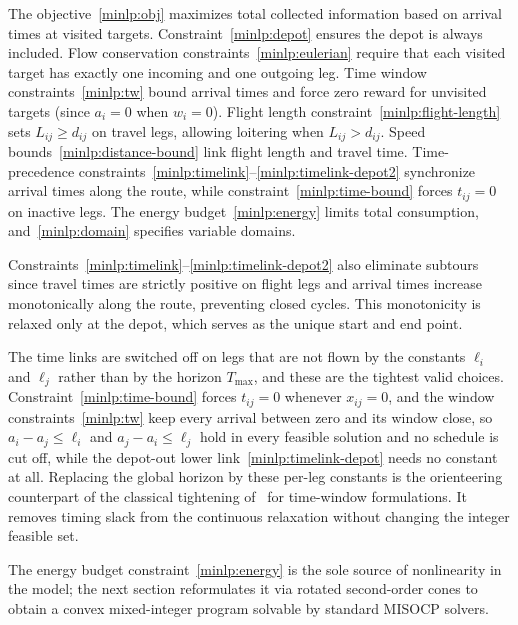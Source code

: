 \documentclass[11pt]{article}
\begin{document}
The objective~\eqref{minlp:obj} maximizes total collected information based on arrival times at visited targets. Constraint~\eqref{minlp:depot} ensures the depot is always included. Flow conservation constraints~\eqref{minlp:eulerian} require that each visited target has exactly one incoming and one outgoing leg. Time window constraints~\eqref{minlp:tw} bound arrival times and force zero reward for unvisited targets (since $a_i = 0$ when $w_i = 0$). Flight length constraint~\eqref{minlp:flight-length} sets $L_{ij} \ge d_{ij}$ on travel legs, allowing loitering when $L_{ij} > d_{ij}$. Speed bounds~\eqref{minlp:distance-bound} link flight length and travel time. Time-precedence constraints~\eqref{minlp:timelink}--\eqref{minlp:timelink-depot2} synchronize arrival times along the route, while constraint~\eqref{minlp:time-bound} forces $t_{ij} = 0$ on inactive legs. The energy budget~\eqref{minlp:energy} limits total consumption, and~\eqref{minlp:domain} specifies variable domains.

Constraints~\eqref{minlp:timelink}--\eqref{minlp:timelink-depot2} also eliminate subtours since travel times are strictly positive on flight legs and arrival times increase monotonically along the route, preventing closed cycles. This monotonicity is relaxed only at the depot, which serves as the unique start and end point.

The time links are switched off on legs that are not flown by the constants $\ell_i$ and $\ell_j$ rather than by the horizon $T_{\max}$, and these are the tightest valid choices. Constraint~\eqref{minlp:time-bound} forces $t_{ij} = 0$ whenever $x_{ij} = 0$, and the window constraints~\eqref{minlp:tw} keep every arrival between zero and its window close, so $a_i - a_j \le \ell_i$ and $a_j - a_i \le \ell_j$ hold in every feasible solution and no schedule is cut off, while the depot-out lower link~\eqref{minlp:timelink-depot} needs no constant at all. Replacing the global horizon by these per-leg constants is the orienteering counterpart of the classical tightening of~\citep{desrochers1991improvements} for time-window formulations. It removes timing slack from the continuous relaxation without changing the integer feasible set.

The energy budget constraint~\eqref{minlp:energy} is the sole source of nonlinearity in the model; the next section reformulates it via rotated second-order cones to obtain a convex mixed-integer program solvable by standard MISOCP solvers.


\end{document}
